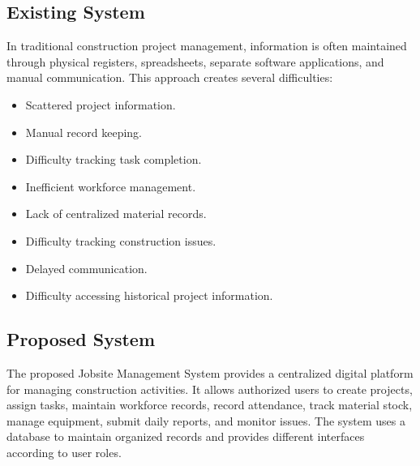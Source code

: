 \documentclass[11pt,a4paper]{article}
\begin{document}
\subsection{Existing System}
In traditional construction project management, information is often maintained through physical registers, spreadsheets, separate software applications, and manual communication. This approach creates several difficulties:
\begin{itemize}
\item Scattered project information.
\item Manual record keeping.
\item Difficulty tracking task completion.
\item Inefficient workforce management.
\item Lack of centralized material records.
\item Difficulty tracking construction issues.
\item Delayed communication.
\item Difficulty accessing historical project information.
\end{itemize}

\subsection{Proposed System}
The proposed Jobsite Management System provides a centralized digital platform for managing construction activities. It allows authorized users to create projects, assign tasks, maintain workforce records, record attendance, track material stock, manage equipment, submit daily reports, and monitor issues. The system uses a database to maintain organized records and provides different interfaces according to user roles.
\end{document}
